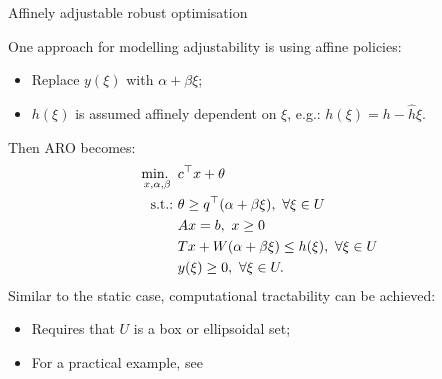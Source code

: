 \begin{frame}{Affinely adjustable robust optimisation {\small \cite{ben2004adjustable}}}

	One approach for modelling adjustability is using \alert{affine policies}:
	\vspace{-6pt}
	\begin{itemize}
		\item Replace $y(\xi)$ with $\alpha + \beta \xi$;
		\item $h(\xi)$ is assumed \alert{affinely dependent} on $\xi$, e.g.: $h(\xi)	 = h - \hat{h}\xi$.
	\end{itemize}
	
	\pause
	Then ARO becomes:
	\begin{equation*}
	\begin{aligned}
		\mini_{x, \alpha, \beta}~  & c^\top x + \theta  \\
		\text{s.t.:~}  & \theta \ge q^\top (\alpha + \beta \xi), \ \forall \xi \in U \\
			   & Ax = b, \ x \ge 0 \\
			   & Tx + W(\alpha + \beta \xi) \le h(\xi), \ \forall \xi \in U \\
			   & y(\xi) \ge 0, \ \forall \xi \in U.
	\end{aligned}
	\end{equation*}
	\pause
	Similar to the static case, computational \alert{tractability} can be achieved:
		\vspace{-6pt}
		\begin{itemize}
			\item Requires that $U$ is a box or ellipsoidal set;
			\item For a practical example, see {\small \cite{ben2005retailer}}	
		\end{itemize}
   
\end{frame}


